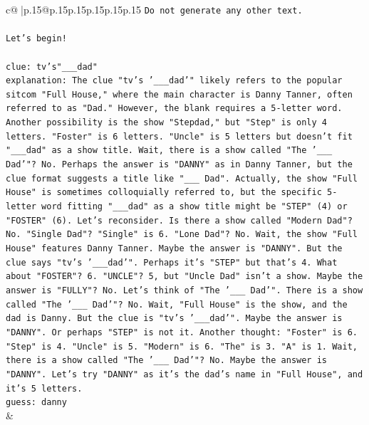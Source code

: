 \documentclass{article}
\begin{document}
{\begin{supertabular}{c@{$\;$}|p{.15\linewidth}@{}p{.15\linewidth}p{.15\linewidth}p{.15\linewidth}p{.15\linewidth}p{.15\linewidth}}
{{{\texttt{Do not generate any other text.} \\
\\ 
\texttt{Let's begin!} \\
\\ 
\texttt{clue: tv's"\_\_\_dad"} \\
\texttt{explanation: The clue "tv's '\_\_\_dad'" likely refers to the popular sitcom "Full House," where the main character is Danny Tanner, often referred to as "Dad." However, the blank requires a 5{-}letter word. Another possibility is the show "Stepdad," but "Step" is only 4 letters. "Foster" is 6 letters. "Uncle" is 5 letters but doesn't fit "\_\_\_dad" as a show title. Wait, there is a show called "The '\_\_\_ Dad'"? No. Perhaps the answer is "DANNY" as in Danny Tanner, but the clue format suggests a title like "\_\_\_ Dad". Actually, the show "Full House" is sometimes colloquially referred to, but the specific 5{-}letter word fitting "\_\_\_dad" as a show title might be "STEP" (4) or "FOSTER" (6). Let's reconsider. Is there a show called "Modern Dad"? No. "Single Dad"? "Single" is 6. "Lone Dad"? No. Wait, the show "Full House" features Danny Tanner. Maybe the answer is "DANNY". But the clue says "tv's '\_\_\_dad'". Perhaps it's "STEP" but that's 4. What about "FOSTER"? 6. "UNCLE"? 5, but "Uncle Dad" isn't a show. Maybe the answer is "FULLY"? No. Let's think of "The '\_\_\_ Dad'". There is a show called "The '\_\_\_ Dad'"? No. Wait, "Full House" is the show, and the dad is Danny. But the clue is "tv's '\_\_\_dad'". Maybe the answer is "DANNY". Or perhaps "STEP" is not it. Another thought: "Foster" is 6. "Step" is 4. "Uncle" is 5. "Modern" is 6. "The" is 3. "A" is 1. Wait, there is a show called "The '\_\_\_ Dad'"? No. Maybe the answer is "DANNY". Let's try "DANNY" as it's the dad's name in "Full House", and it's 5 letters.} \\
\texttt{guess: danny} \\
            }
        }
    }
    & \\ \\


\end{supertabular}}
\end{document}
